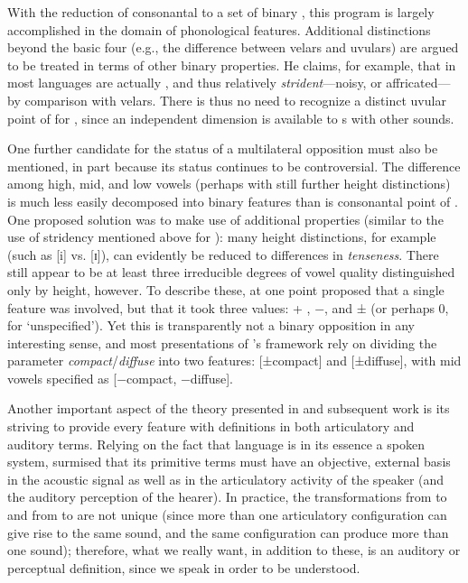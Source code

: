 With the reduction of consonantal  to a set of
binary , this program is largely accomplished in the domain
of phonological features. Additional 
distinctions beyond the basic four (e.g., the difference between
velars and uvulars) are argued to be treated in terms of other binary
properties. He claims, for example, that   in most
languages are actually , and thus relatively
\emph{strident}—noisy, or affricated—by comparison with velars. There
is thus no need to recognize a distinct uvular point of 
for , since an independent dimension is available to
 s with other sounds.

One further candidate for the status of a multilateral opposition must
also be mentioned, in part because its status continues to be
controversial. The difference among high, mid, and low vowels (perhaps
with still further height distinctions) is much less easily decomposed
into binary features than is consonantal point of . One
proposed solution was to make use of additional properties (similar to
the use of stridency mentioned above for ): many height
distinctions, for example (such as [i] vs. [ɪ]), can evidently be
reduced to differences in \emph{tenseness}. There still appear to be
at least three irreducible degrees of vowel quality distinguished only
by height, however. To describe these, {\Jakobson} at one point proposed
that a single feature was involved, but that it took three values: + ,
$-$, and ± (or perhaps 0, for `unspecified'). Yet this is
transparently not a binary opposition in any interesting sense, and
most presentations of {\Jakobson}'s framework rely on dividing the
parameter \emph{compact}/\emph{diffuse} into two features: [±compact]
and [±diffuse], with mid vowels specified as [$-$compact, $-$diffuse].

Another important aspect of the theory presented in
\citet{jakobson39:classement} and subsequent work is its striving to
provide every feature with definitions in both articulatory and
auditory terms. Relying on the fact that language is in its essence a
spoken system, {\Jakobson} surmised that its primitive terms must have an
objective, external basis in the acoustic signal as well as in the
articulatory activity of the speaker (and the auditory perception of
the hearer). In practice, the transformations from  to
 and from  to  are not unique (since
more than one articulatory configuration can give rise to the same
sound, and the same configuration can produce more than one sound);
therefore, what we really want, in addition to these, is an auditory
or perceptual definition, since we speak in order to be understood.

